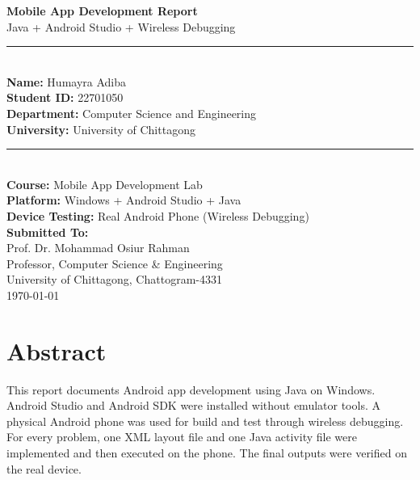 \documentclass[12pt]{article}
\begin{document}
\begin{titlepage}
\begin{center}
    \vspace*{1cm}
    
    {\Huge \textbf{Mobile App Development Report}}\\[0.4cm]
    {\Large Java + Android Studio + Wireless Debugging}\\[1.0cm]

    \rule{0.9\textwidth}{0.8pt}\\[0.6cm]

    \textbf{Name:} Humayra Adiba\\
    \textbf{Student ID:} 22701050\\
    \textbf{Department:} Computer Science and Engineering\\
    \textbf{University:} University of Chittagong\\[0.6cm]

    \rule{0.9\textwidth}{0.8pt}\\[1cm]

    \textbf{Course:} Mobile App Development Lab\\
    \textbf{Platform:} Windows + Android Studio + Java\\
    \textbf{Device Testing:} Real Android Phone (Wireless Debugging)\\[1.2cm]

    \textbf{Submitted To:}\\[6pt]
    Prof. Dr. Mohammad Osiur Rahman\\
    Professor, Computer Science \& Engineering\\
    University of Chittagong, Chattogram-4331\\[1.2cm]

    \today

\end{center}
\end{titlepage}

\tableofcontents
\newpage

\section*{Abstract}
This report documents Android app development using Java on Windows. Android Studio and Android SDK were installed without emulator tools. A physical Android phone was used for build and test through wireless debugging. For every problem, one XML layout file and one Java activity file were implemented and then executed on the phone. The final outputs were verified on the real device.
\end{document}
